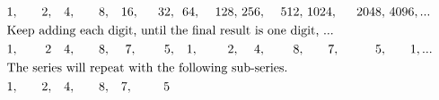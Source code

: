 \begin{alignat*}{15}
&1,&\quad2,&\quad4,&\quad8,&~~~16,&~~32,&~~64,&~128,&~256,&~512,&~1024,&~2048,&~4096, ...\\
\rlap{\text{Keep adding each digit, until the final result is one digit, ...}}\\
&1,&\quad2&\quad4,&\quad8,&\quad~7,&\quad5,&\quad1,&\quad~2,&\quad~4,&\quad~8,&\quad~~~7,&\quad~~~5,&\quad~~~1, ...\\
\rlap{\text{The series will repeat with the following sub-series.}}\\
&1,&\quad2,&\quad4,&\quad8,&\quad7,&\quad5~
\end{alignat*}
